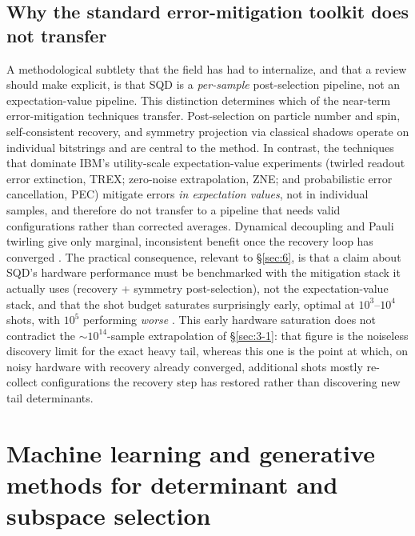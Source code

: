 \documentclass[11pt]{article}
\begin{document}
\subsection{Why the standard error-mitigation toolkit does not transfer}\label{sec:3-3}

A methodological subtlety that the field has had to internalize, and that a review should make explicit, is that SQD is a \emph{per-sample} post-selection pipeline, not an expectation-value pipeline. This distinction determines which of the near-term error-mitigation techniques transfer. Post-selection on particle number and spin, self-consistent recovery, and symmetry projection via classical shadows \cite{huang2020} operate on individual bitstrings and are central to the method. In contrast, the techniques that dominate IBM's utility-scale expectation-value experiments (twirled readout error extinction, TREX; zero-noise extrapolation, ZNE; and probabilistic error cancellation, PEC) mitigate errors \emph{in expectation values}, not in individual samples, and therefore do not transfer to a pipeline that needs valid configurations rather than corrected averages. Dynamical decoupling and Pauli twirling give only marginal, inconsistent benefit once the recovery loop has converged \cite{bhuiyan2026}. The practical consequence, relevant to \S\ref{sec:6}, is that a claim about SQD's hardware performance must be benchmarked with the mitigation stack it actually uses (recovery + symmetry post-selection), not the expectation-value stack, and that the shot budget saturates surprisingly early, optimal at $10^3$--$10^4$ shots, with $10^5$ performing \emph{worse} \cite{bhuiyan2026}. This early hardware saturation does not contradict the ${\sim}10^{14}$-sample extrapolation of \S\ref{sec:3-1}: that figure is the noiseless discovery limit for the exact heavy tail, whereas this one is the point at which, on noisy hardware with recovery already converged, additional shots mostly re-collect configurations the recovery step has restored rather than discovering new tail determinants.


\section{Machine learning and generative methods for determinant and subspace selection}\label{sec:4}
\end{document}
